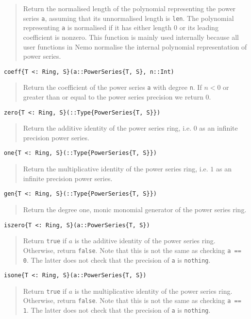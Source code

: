 \documentclass[a4paper,10pt]{article}
\newcommand{\code}{\lstinline}
\newcommand{\desc}[1]{\vspace{-3mm}\begin{quote}#1\end{quote}}
\begin{document}
{{{\desc{Return the normalised length of the polynomial representing the power
series \code{a}, assuming that its unnormalised length is \code{len}. The
polynomial representing \code{a} is normalised if it has either length $0$
or its leading coefficient is nonzero. This function is mainly used internally
because all user functions in Nemo normalise the internal polynomial
representation of power series.}

\begin{lstlisting}
coeff{T <: Ring, S}(a::PowerSeries{T, S}, n::Int)
\end{lstlisting}

\desc{Return the coefficient of the power series \code{a} with degree 
\code{n}. If $n < 0$ or greater than or equal to the power series precision
we return $0$.}

\begin{lstlisting}
zero{T <: Ring, S}(::Type{PowerSeries{T, S}})
\end{lstlisting}

\desc{Return the additive identity of the power series ring, i.e. $0$ as an
infinite precision power series.}

\begin{lstlisting}
one{T <: Ring, S}(::Type{PowerSeries{T, S}})
\end{lstlisting}

\desc{Return the multiplicative identity of the power series ring, i.e. $1$ as an
infinite precision power series.}

\begin{lstlisting}
gen{T <: Ring, S}(::Type{PowerSeries{T, S}})
\end{lstlisting}

\desc{Return the degree one, monic monomial generator of the power series
ring.}

\begin{lstlisting}
iszero{T <: Ring, S}(a::PowerSeries{T, S})
\end{lstlisting}

\desc{Return \code{true} if $a$ is the additive identity of the power series
ring. Otherwise, return \code{false}. Note that this is not the same as
checking \code{a == 0}. The latter does not check that the precision of
\code{a} is \code{nothing}.}

\begin{lstlisting}
isone{T <: Ring, S}(a::PowerSeries{T, S})
\end{lstlisting}

\desc{Return \code{true} if $a$ is the multiplicative identity of the power
series ring. Otherwise, return \code{false}. Note that this is not the same
as checking \code{a == 1}. The latter does not check that the precision of
\code{a} is \code{nothing}.}

}}}
\end{document}
